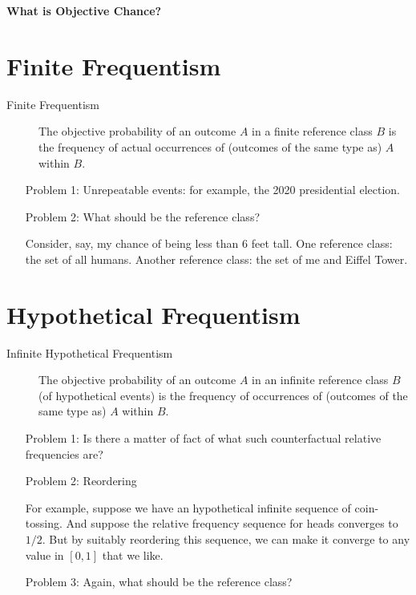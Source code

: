 \documentclass[11pt]{article}
\theoremstyle{definition}
\begin{document}




\begin{center}
{\LARGE \bf What is Objective Chance?}
\end{center}

\smallskip

\section{Finite Frequentism}

\begin{description}
\item[Finite Frequentism] The objective probability of an outcome $A$ in a finite reference class $B$ is the frequency of actual occurrences of (outcomes of the same type as) $A$ within $B$.
\end{description}

\begin{enumerate}[leftmargin=4.4 \parindent]
\item[Problem 1:] Unrepeatable events: for example, the 2020 presidential election. 
\item[Problem 2:] What should be the reference class?

\indent Consider, say, my chance of being less than $6$ feet tall. One reference class: the set of all humans. Another reference class: the set of me and Eiffel Tower.
\end{enumerate}


\section{Hypothetical Frequentism}
\begin{description}
\item[Infinite Hypothetical Frequentism] The objective probability of an outcome $A$ in an infinite reference class $B$ (of hypothetical events) is the frequency of occurrences of (outcomes of the same type as) $A$ within $B$.
\end{description}

\begin{enumerate}[leftmargin=4.5\parindent]
\item[Problem 1:] Is there a matter of fact of what such counterfactual relative frequencies are?
\item[Problem 2:] Reordering 

For example, suppose we have an hypothetical infinite sequence of coin-tossing. And suppose the relative frequency sequence for heads converges to $1/2$. But by suitably reordering this sequence, we can make it converge to any value in $[0, 1]$ that we like.

\item[Problem 3:] Again, what should be the reference class?

\end{enumerate}
\end{document}
